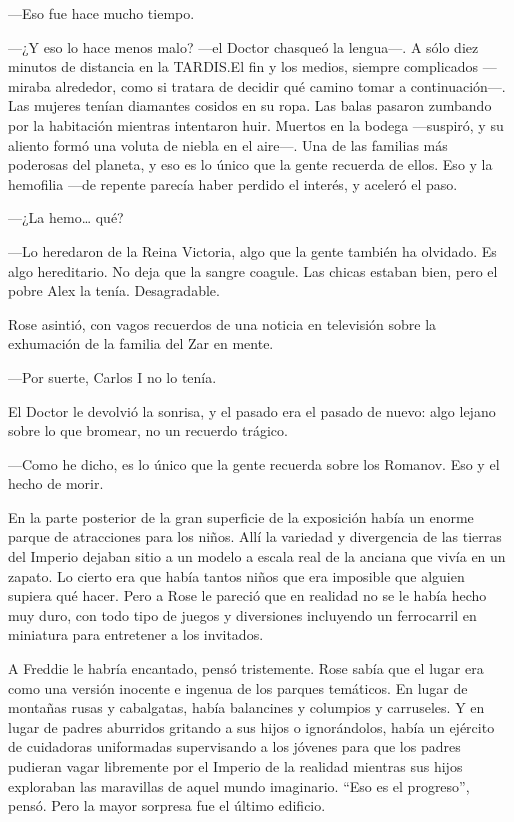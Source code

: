 {---Eso fue hace mucho tiempo.}

{---¿Y eso lo hace menos malo? ---el Doctor chasqueó la lengua---. A
	sólo diez minutos de distancia en la TARDIS.\@ El fin y los medios,
	siempre complicados ---miraba alrededor, como si tratara de decidir qué
	camino tomar a continuación---. Las mujeres tenían diamantes cosidos en
	su ropa. Las balas pasaron zumbando por la habitación mientras
	intentaron huir. Muertos en la bodega ---suspiró, y su aliento formó una
	voluta de niebla en el aire---. Una de las familias más poderosas del
	planeta, y eso es lo único que la gente recuerda de ellos. Eso y la
	hemofilia ---de repente parecía haber perdido el interés, y aceleró el
paso.}

{---¿La hemo\ldots{} qué?}

{---Lo heredaron de la Reina Victoria, algo que la gente también ha
	olvidado. Es algo hereditario. No deja que la sangre coagule. Las chicas
estaban bien, pero el pobre Alex la tenía. Desagradable.}

{Rose asintió, con vagos recuerdos de una noticia en televisión sobre la
exhumación de la familia del Zar en mente.}

{---Por suerte, Carlos I no lo tenía.}

{El Doctor le devolvió la sonrisa, y el pasado era el pasado de nuevo:
algo lejano sobre lo que bromear, no un recuerdo trágico.}

{---Como he dicho, es lo único que la gente recuerda sobre los Romanov.
Eso y el hecho de morir.}

{En la parte posterior de la gran superficie de la exposición había un
	enorme parque de atracciones para los niños. Allí la variedad y
	divergencia de las tierras del Imperio dejaban sitio a un modelo a
	escala real de la anciana que vivía en un zapato. Lo cierto era que
	había tantos niños que era imposible que alguien supiera qué hacer. Pero
	a Rose le pareció que en realidad no se le había hecho muy duro, con
	todo tipo de juegos y diversiones incluyendo un ferrocarril en miniatura
para entretener a los invitados.}

{A Freddie le habría encantado, pensó tristemente. Rose sabía que el
	lugar era como una versión inocente e ingenua de los parques temáticos.
	En lugar de montañas rusas y cabalgatas, había balancines y columpios y
	carruseles. Y en lugar de padres aburridos gritando a sus hijos o
	ignorándolos, había un ejército de cuidadoras uniformadas supervisando a
	los jóvenes para que los padres pudieran vagar libremente por el Imperio
	de la realidad mientras sus hijos exploraban las maravillas de aquel
	mundo imaginario. ``Eso es el progreso'', pensó. Pero la mayor sorpresa
fue el último edificio.}

